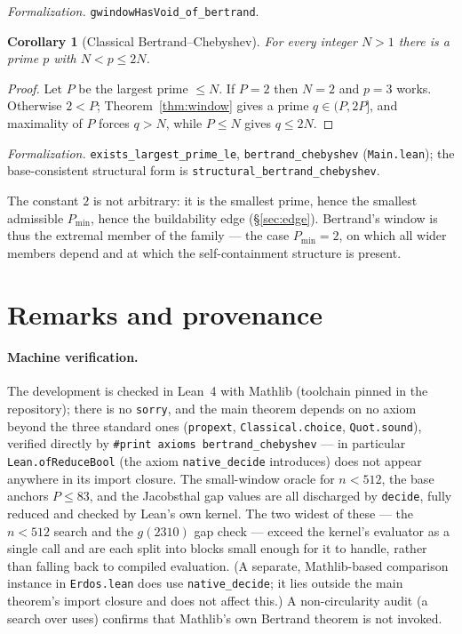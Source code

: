 \documentclass[11pt,a4paper]{amsart}
\theoremstyle{plain}
\newtheorem{corollary}[theorem]{Corollary}
\theoremstyle{definition}
\theoremstyle{plain}
\theoremstyle{remark}
\newcommand{\lean}[1]{\textup{\texttt{#1}}}
\newcommand{\Formal}[1]{\par\smallskip\noindent\emph{Formalization.} #1\par\smallskip}
\begin{document}
\Formal{\lean{gwindowHasVoid\_of\_bertrand}.}

\begin{corollary}[Classical Bertrand--Chebyshev]\label{cor:classical}
For every integer $N>1$ there is a prime $p$ with $N<p\le2N$.
\end{corollary}

\begin{proof}
Let $P$ be the largest prime $\le N$. If $P=2$ then $N=2$ and $p=3$ works. Otherwise
$2<P$; Theorem~\ref{thm:window} gives a prime $q\in(P,2P]$, and maximality of $P$ forces
$q>N$, while $P\le N$ gives $q\le2N$.
\end{proof}

\Formal{\lean{exists\_largest\_prime\_le}, \lean{bertrand\_chebyshev} (\lean{Main.lean});
the base-consistent structural form is \lean{structural\_bertrand\_chebyshev}.}

The constant $2$ is not arbitrary: it is the smallest prime, hence the smallest admissible
$P_{\min}$, hence the buildability edge (\S\ref{sec:edge}). Bertrand's window is thus the
extremal member of the family --- the case $P_{\min}=2$, on which all wider members depend and
at which the self-containment structure is present.

\section{Remarks and provenance}

\paragraph{Machine verification.}
The development is checked in Lean~4 with Mathlib (toolchain pinned in the repository);
there is no \texttt{sorry}, and the main theorem depends on no axiom beyond the three
standard ones (\texttt{propext}, \texttt{Classical.choice}, \texttt{Quot.sound}), verified
directly by \lean{\#print axioms bertrand\_chebyshev} --- in particular
\lean{Lean.ofReduceBool} (the axiom \lean{native\_decide} introduces) does not appear
anywhere in its import closure. The small-window oracle for $n<512$, the base anchors
$P\le83$, and the Jacobsthal gap values are all discharged by \lean{decide}, fully reduced
and checked by Lean's own kernel. The two widest of these --- the $n<512$ search and the
$g(2310)$ gap check --- exceed the kernel's evaluator as a single call and are each split
into blocks small enough for it to handle, rather than falling back to compiled evaluation.
(A separate, Mathlib-based comparison instance in \lean{Erdos.lean} does use
\lean{native\_decide}; it lies outside the main theorem's import closure and does not affect
this.) A non-circularity audit (a search over uses) confirms that Mathlib's own Bertrand
theorem is not invoked.
\end{document}
